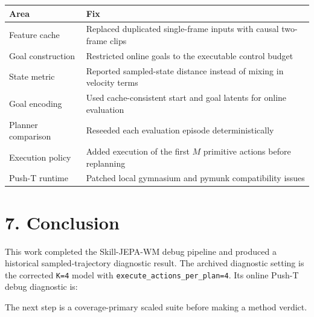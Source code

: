\documentclass[11pt]{article}
\begin{document}
\begin{center}
\small
\begin{tabular}{ll}
\toprule
\rowcolor{ReportBlue!10}
Area & Fix \\
\midrule
Feature cache & Replaced duplicated single-frame inputs with causal two-frame clips \\
Goal construction & Restricted online goals to the executable control budget \\
State metric & Reported sampled-state distance instead of mixing in velocity terms \\
Goal encoding & Used cache-consistent start and goal latents for online evaluation \\
Planner comparison & Reseeded each evaluation episode deterministically \\
Execution policy & Added execution of the first \(M\) primitive actions before replanning \\
Push-T runtime & Patched local gymnasium and pymunk compatibility issues \\
\bottomrule
\end{tabular}
\end{center}

\section*{7. Conclusion}

This work completed the Skill-JEPA-WM debug pipeline and produced a historical sampled-trajectory diagnostic result.
The archived diagnostic setting is the corrected \texttt{K=4} model with \texttt{execute\_actions\_per\_plan=4}.
Its online Push-T debug diagnostic is:

\begin{center}
\end{center}

The next step is a coverage-primary scaled suite before making a method verdict.
\end{document}
